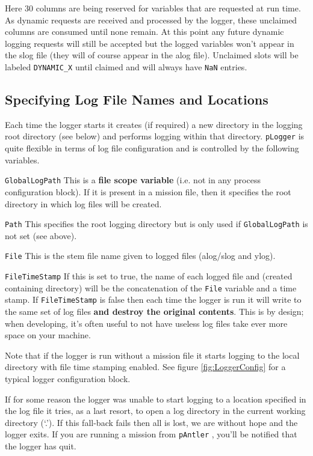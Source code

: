 \documentclass[a4paper,10pt]{article}
\newcommand{\Code}[1]{\texttt{#1} }
\newcommand{\code}[1]{\Code{#1} }
\begin{document}
Here 30 columns are being reserved for variables that are requested at run time. As dynamic requests are received and processed by the logger, these unclaimed columns are consumed until none remain. At this point any future dynamic logging requests will still be accepted but the logged variables won't appear in the slog file (they will of course appear in the alog file). Unclaimed slots will be labeled \code{DYNAMIC\_X} until claimed and will always have \code{NaN} entries.


\subsection{Specifying Log File Names and Locations}\label{Sec:Places}

Each time the logger starts it creates (if required) a new directory in the logging root directory (see below) and performs logging within that directory. \code{pLogger} is quite flexible in terms of log file configuration and is controlled by the following variables.

\begin{description}
\item{\code{GlobalLogPath}} This is a {\textbf{file scope variable}} (i.e. not in any process configuration block). If it is present in a mission file, then it specifies the root directory in which log files will be created.
\item{\code{Path}} This specifies the root logging directory but is only used if \code{GlobalLogPath} is not set (see above).
\item{\code{File}} This is the stem file name given to logged files (alog/slog and ylog).
\item{\code{FileTimeStamp}} If this is set to true, the name of  each logged file and (created containing directory) will be the concatenation of the \code{File} variable and a time stamp. If \code{FileTimeStamp} is false then each time the logger is run it will write to the same set of log files {\textbf{and destroy the original contents}}. This is by design; when developing, it's often useful to not have useless log files take ever more space on your machine.
\end{description}

Note that if the logger is run without a mission file it starts logging to the local directory with file time stamping enabled. See figure \ref{fig:LoggerConfig} for a typical logger configuration block.

If for some reason the logger was unable to start logging to a location specified in the log file it tries, as a last resort, to open a log directory in the current working directory (`.'). If this fall-back fails then all is lost, we are without hope and the logger exits. If you are running a mission from \code{pAntler}, you'll be notified that the logger has quit.
\end{document}
